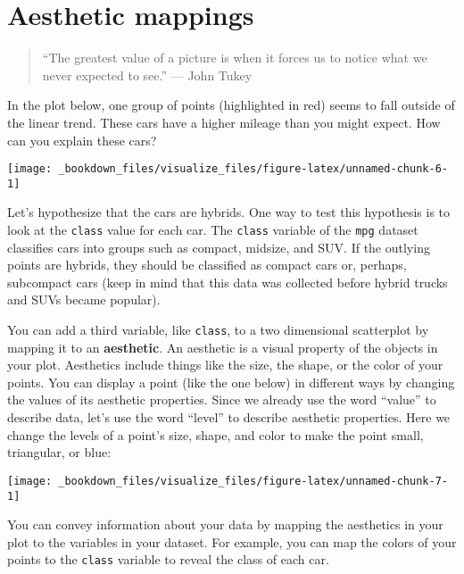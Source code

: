 \documentclass[]{book}
\begin{document}
\section{Aesthetic mappings}\label{aesthetic-mappings}

\begin{quote}
``The greatest value of a picture is when it forces us to notice what we
never expected to see.'' --- John Tukey
\end{quote}

In the plot below, one group of points (highlighted in red) seems to
fall outside of the linear trend. These cars have a higher mileage than
you might expect. How can you explain these cars?

\begin{center}\texttt{[image: \_bookdown\_files/visualize\_files/figure-latex/unnamed-chunk-6-1]} \end{center}

Let's hypothesize that the cars are hybrids. One way to test this
hypothesis is to look at the \texttt{class} value for each car. The
\texttt{class} variable of the \texttt{mpg} dataset classifies cars into
groups such as compact, midsize, and SUV. If the outlying points are
hybrids, they should be classified as compact cars or, perhaps,
subcompact cars (keep in mind that this data was collected before hybrid
trucks and SUVs became popular).

You can add a third variable, like \texttt{class}, to a two dimensional
scatterplot by mapping it to an \textbf{aesthetic}. An aesthetic is a
visual property of the objects in your plot. Aesthetics include things
like the size, the shape, or the color of your points. You can display a
point (like the one below) in different ways by changing the values of
its aesthetic properties. Since we already use the word ``value'' to
describe data, let's use the word ``level'' to describe aesthetic
properties. Here we change the levels of a point's size, shape, and
color to make the point small, triangular, or blue:

\begin{center}\texttt{[image: \_bookdown\_files/visualize\_files/figure-latex/unnamed-chunk-7-1]} \end{center}

You can convey information about your data by mapping the aesthetics in
your plot to the variables in your dataset. For example, you can map the
colors of your points to the \texttt{class} variable to reveal the class
of each car.
\end{document}
